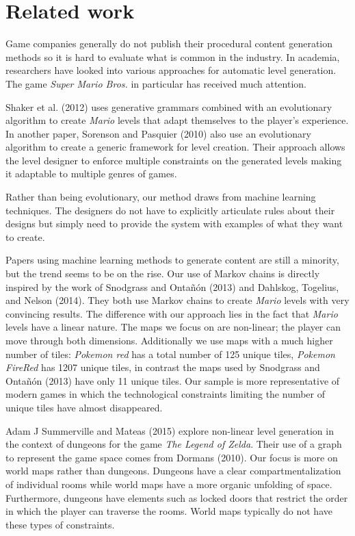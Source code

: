 \documentclass[A4paper,]{article}
\begin{document}
\section{Related work}\label{related-work}

Game companies generally do not publish their procedural content
generation methods so it is hard to evaluate what is common in the
industry. In academia, researchers have looked into various approaches
for automatic level generation. The game \emph{Super Mario Bros.} in
particular has received much attention.

Shaker et al. (2012) uses generative grammars combined with an
evolutionary algorithm to create \emph{Mario} levels that adapt
themselves to the player's experience. In another paper, Sorenson and
Pasquier (2010) also use an evolutionary algorithm to create a generic
framework for level creation. Their approach allows the level designer
to enforce multiple constraints on the generated levels making it
adaptable to multiple genres of games.

Rather than being evolutionary, our method draws from machine learning
techniques. The designers do not have to explicitly articulate rules
about their designs but simply need to provide the system with examples
of what they want to create.

Papers using machine learning methods to generate content are still a
minority, but the trend seems to be on the rise. Our use of Markov
chains is directly inspired by the work of Snodgrass and Ontañón (2013)
and Dahlskog, Togelius, and Nelson (2014). They both use Markov chains
to create \emph{Mario} levels with very convincing results. The
difference with our approach lies in the fact that \emph{Mario} levels
have a linear nature. The maps we focus on are non-linear; the player
can move through both dimensions. Additionally we use maps with a much
higher number of tiles: \emph{Pokemon red} has a total number of 125
unique tiles, \emph{Pokemon FireRed} has 1207 unique tiles, in contrast
the maps used by Snodgrass and Ontañón (2013) have only 11 unique tiles.
Our sample is more representative of modern games in which the
technological constraints limiting the number of unique tiles have
almost disappeared.

Adam J Summerville and Mateas (2015) explore non-linear level generation
in the context of dungeons for the game \emph{The Legend of Zelda}.
Their use of a graph to represent the game space comes from Dormans
(2010). Our focus is more on world maps rather than dungeons. Dungeons
have a clear compartmentalization of individual rooms while world maps
have a more organic unfolding of space. Furthermore, dungeons have
elements such as locked doors that restrict the order in which the
player can traverse the rooms. World maps typically do not have these
types of constraints.
\end{document}
